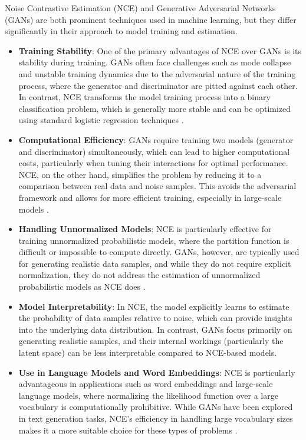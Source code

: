 Noise Contrastive Estimation (NCE) and Generative Adversarial Networks (GANs) are both prominent techniques used in machine learning, but they differ significantly in their approach to model training and estimation.

\begin{itemize}
    \item \textbf{Training Stability}: One of the primary advantages of NCE over GANs is its stability during training. GANs often face challenges such as mode collapse and unstable training dynamics due to the adversarial nature of the training process, where the generator and discriminator are pitted against each other. In contrast, NCE transforms the model training process into a binary classification problem, which is generally more stable and can be optimized using standard logistic regression techniques \citep{10.18653/v1/e17-2003}.
    
    \item \textbf{Computational Efficiency}: GANs require training two models (generator and discriminator) simultaneously, which can lead to higher computational costs, particularly when tuning their interactions for optimal performance. NCE, on the other hand, simplifies the problem by reducing it to a comparison between real data and noise samples. This avoids the adversarial framework and allows for more efficient training, especially in large-scale models \citep{10.21437/interspeech.2016-1295}.
    
    \item \textbf{Handling Unnormalized Models}: NCE is particularly effective for training unnormalized probabilistic models, where the partition function is difficult or impossible to compute directly. GANs, however, are typically used for generating realistic data samples, and while they do not require explicit normalization, they do not address the estimation of unnormalized probabilistic models as NCE does \citep{10.48550/arxiv.2101.03288}.
    
    \item \textbf{Model Interpretability}: In NCE, the model explicitly learns to estimate the probability of data samples relative to noise, which can provide insights into the underlying data distribution. In contrast, GANs focus primarily on generating realistic samples, and their internal workings (particularly the latent space) can be less interpretable compared to NCE-based models.
    
    \item \textbf{Use in Language Models and Word Embeddings}: NCE is particularly advantageous in applications such as word embeddings and large-scale language models, where normalizing the likelihood function over a large vocabulary is computationally prohibitive. While GANs have been explored in text generation tasks, NCE's efficiency in handling large vocabulary sizes makes it a more suitable choice for these types of problems \citep{10.48550/arxiv.2101.03288}.
\end{itemize}

